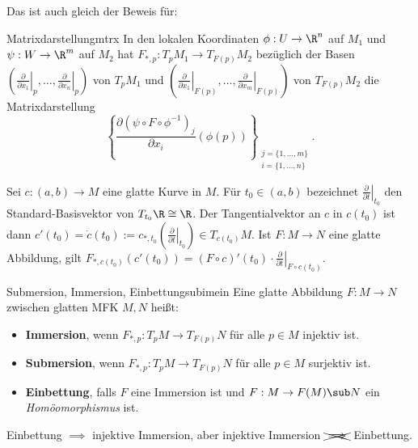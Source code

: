 Das ist auch gleich der Beweis für:
\begin{satz}{Matrixdarstellung}{mtrx}
In den lokalen Koordinaten $\phi: U \to \R^n$ auf $M_1$ und $\psi: W \to \R^m$ auf $M_2$ hat $F_{\ast, p}: T_pM_1 \to T_{F(p)}M_2$ bezüglich der Basen $\left( \left.\frac{\partial}{\partial x_1}\right|_p, \dots, \left.\frac{\partial}{\partial x_n}\right|_p \right)$ von $T_pM_1$ und $\left( \left.\frac{\partial}{\partial x_1}\right|_{F(p)}, \dots, \left.\frac{\partial}{\partial x_m}\right|_{F(p)} \right)$ von $T_{F(p)}M_2$ die Matrixdarstellung
\begin{equation}
\left\{ \frac{\partial (\psi \circ F \circ \phi^{-1})_j}{\partial x_i} (\phi(p))\right\}_{\substack{j= \{1, \dots, m\}\\i = \{ 1, \dots, n\}}}.
\end{equation}
\end{satz}
\begin{beispiel}
Sei $c: (a,b) \to M$ eine glatte Kurve in $M$. Für $t_0 \in (a,b)$ bezeichnet $\left.\frac{\partial}{\partial t}\right|_{t_0}$ den Standard-Basisvektor von $T_{t_0}\R \cong \R$. Der Tangentialvektor an $c$ in $c(t_0)$ ist dann $c'(t_0)=\dot{c}(t_0):= c_{\ast, t_0}\left(\left.\frac{\partial}{\partial t}\right|_{t_0} \right) \in T_{c(t_0)}M$. Ist $F: M \to N$ eine glatte Abbildung, gilt $F_{\ast, c(t_0)} (c'(t_0)) = (F \circ c)'(t_0) \cdot \left.\frac{\partial}{\partial t}\right|_{F \circ c(t_0)}$.
\end{beispiel}
\begin{definition}{Submersion, Immersion, Einbettung}{subimein}
Eine glatte Abbildung $F: M \to N$ zwischen glatten MFK $M, N$ heißt:
\begin{itemize}
\item \textbf{Immersion}, wenn $F_{\ast, p}: T_pM \to T_{F(p)}N$ für alle $p \in M$ injektiv ist.
\item \textbf{Submersion}, wenn $F_{\ast, p}: T_pM \to T_{F(p)}N$ für alle $p \in M$ surjektiv ist.
\item \textbf{Einbettung}, falls $F$ eine Immersion ist und $F: M \to F(M) \sub N$ ein \textit{Homöomorphismus} ist.
\end{itemize}
\end{definition}
\begin{bemerkung}
Einbettung $\implies$ injektive Immersion, aber injektive Immersion $\xcancel{\implies}$ Einbettung.
\end{bemerkung}
